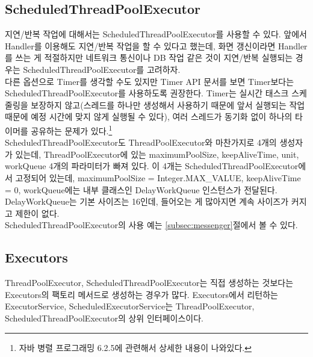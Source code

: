\subsection{ScheduledThreadPoolExecutor}
지연/반복 작업에 대해서는 ScheduledThreadPoolExecutor를 사용할 수 있다.
앞에서 Handler를 이용해도 지연/반복 작업을 할 수 있다고 했는데, 화면 갱신이라면 Handler를 쓰는 게 적절하지만 네트워크 통신이나 DB 작업 같은 것이 지연/반복 실행되는 경우는 ScheduledThreadPoolExecutor를 고려하자.\\

다른 옵션으로 Timer를 생각할 수도 있지만 Timer API 문서를 보면 Timer보다는 ScheduledThreadPoolExecutor를 사용하도록 권장한다. Timer는 실시간 태스크 스케줄링을 보장하지 않고(스레드를 하나만 생성해서 사용하기 때문에 앞서 실행되는 작업 때문에 예정 시간에 맞지 않게 실행될 수 있다), 여러 스레드가 동기화 없이 하나의 타이머를 공유하는 문제가 있다.\footnote{자바 병렬 프로그래밍 6.2.5에 관련해서 상세한 내용이 나와있다.}\\

ScheduledThreadPoolExecutor도 ThreadPoolExecutor와 마찬가지로 4개의 생성자가 있는데, ThreadPoolExecutor에 있는 maximumPoolSize, keepAliveTime, unit, workQueue 4개의 파라미터가 빠져 있다. 
이 4개는 ScheduledThreadPoolExecutor에서 고정되어 있는데,
maximumPoolSize = Integer.MAX\_VALUE, keepAliveTime = 0, workQueue에는 내부 클래스인 DelayWorkQueue 인스턴스가 전달된다.
DelayWorkQueue는 기본 사이즈는 16인데, 들어오는 게 많아지면 계속 사이즈가 커지고 제한이 없다.\\

ScheduledThreadPoolExecutor의 사용 예는 \ref{subsec:messenger}절에서 볼 수 있다.

\subsection{Executors}
ThreadPoolExecutor, ScheduledThreadPoolExecutor는 직접 생성하는 것보다는 Executors의 팩토리 메서드로 생성하는 경우가 많다.
Executors에서 리턴하는 ExecutorService, ScheduledExecutorService는 ThreadPoolExecutor, ScheduledThreadPoolExecutor의 상위 인터페이스이다.\\


